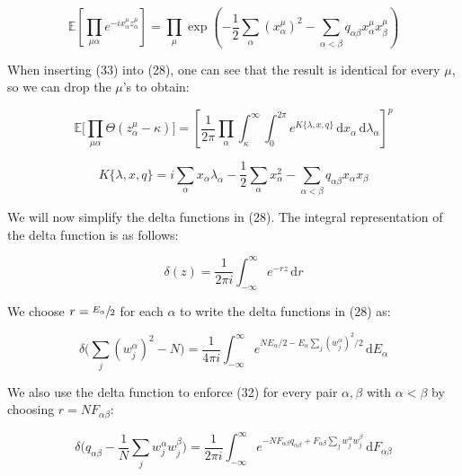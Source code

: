 \begin{equation}
    \mathbb{E} \left[\prod_{\mu\alpha} e^{-ix_\alpha^\mu z_\alpha^\mu} \right] = \prod_\mu \exp \left( -\frac{1}{2} \sum_\alpha (x_\alpha^\mu)^2 - \sum_{\alpha < \beta} q_{\alpha\beta} x_\alpha^\mu x_\beta^\mu \right)
\end{equation}

When inserting (33) into (28), one can see that the result is identical for every $\mu$, so we can drop the $\mu$'s to obtain:

\begin{equation}
    \mathbb{E} \Big[ \prod_{\mu\alpha} \Theta(z_\alpha^\mu - \kappa) \Big] = \left[ \frac{1}{2 \pi} \prod_\alpha \int_\kappa^{\infty} \int_0^{2 \pi} e^{K\{\lambda, x, q\}} \, \mathrm{d} x_\alpha \, \mathrm{d} \lambda_\alpha \right] ^p
\end{equation}

\begin{equation}
    K\{\lambda, x, q\} = i \sum_\alpha x_\alpha \lambda_\alpha - \frac{1}{2} \sum_\alpha x_\alpha^2 - \sum_{\alpha < \beta} q_{\alpha\beta} x_\alpha x_\beta
\end{equation}

We will now simplify the delta functions in (28). The integral representation of the delta function is as follows:

\begin{equation}
    \delta(z) = \frac{1}{2 \pi i} \int_{- \infty}^{\infty} e^{-rz} \, \mathrm{d} r
\end{equation}

We choose $r = \sfrac{E_\alpha}{2}$ for each $\alpha$ to write the delta functions in (28) as:

\begin{equation}
    \delta \Big( \sum_j (w_j^\alpha)^2 - N \Big) = \frac{1}{4 \pi i} \int_{- \infty}^{\infty} e^{N E_\alpha / 2 - E_\alpha \sum_j (w_j^\alpha)^2 / 2} \, \mathrm{d} E_\alpha
\end{equation}

We also use the delta function to enforce (32) for every pair $\alpha, \beta$ with $\alpha < \beta$ by choosing $r = N F_{\alpha\beta}$:

\begin{equation}
    \delta \Big( q_{\alpha\beta} - \frac{1}{N} \sum_{j} w_j^\alpha w_j^\beta \Big) = \frac{1}{2 \pi i} \int_{- \infty}^{\infty} e^{- N F_{\alpha\beta} q_{\alpha\beta} + F_{\alpha\beta} \sum_j w_j^\alpha w_j^\beta} \, \mathrm{d} F_{\alpha \beta}
\end{equation}

